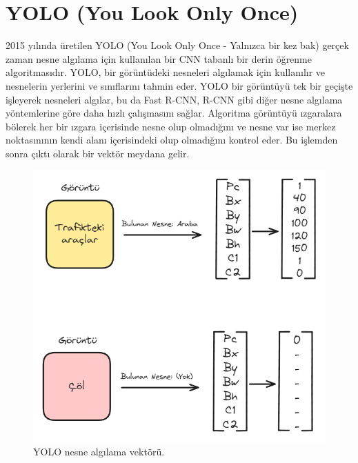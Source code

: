 \section{YOLO (You Look Only Once)}
2015 yılında üretilen YOLO (You Look Only Once - Yalnızca bir kez bak) gerçek zaman nesne algılama için kullanılan bir CNN tabanlı bir derin öğrenme algoritmasıdır. YOLO, bir görüntüdeki nesneleri algılamak için kullanılır ve nesnelerin yerlerini ve sınıflarını tahmin eder. YOLO bir görüntüyü tek bir geçişte işleyerek nesneleri algılar, bu da Fast R-CNN, R-CNN gibi diğer nesne algılama yöntemlerine göre daha hızlı çalışmasını sağlar. Algoritma görüntüyü ızgaralara bölerek her bir ızgara içerisinde nesne olup olmadığını ve nesne var ise merkez noktasınının kendi alanı içerisindeki olup olmadığını kontrol eder. Bu işlemden sonra çıktı olarak bir vektör meydana gelir.

\begin{figure}[h]
    \centering
    \includegraphics[width=1\textwidth]{images/yolo_vector.png}
    \caption{YOLO nesne algılama vektörü.}
    \label{fig:enter-label}
\end{figure}

